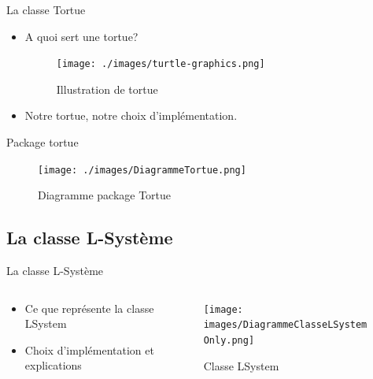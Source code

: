 \documentclass{beamer}
\begin{document}
\begin{frame}{La classe Tortue}
    \begin{itemize}
        \item A quoi sert une tortue?
        \begin{figure}[h]
            \centering
           \texttt{[image: ./images/turtle-graphics.png]}
           \caption{Illustration de tortue}
        \end{figure}
        \item Notre tortue, notre choix d'implémentation.
    \end{itemize}
\end{frame}
\begin{frame}{Package tortue}
    \begin{figure}[h]
	   \texttt{[image: ./images/DiagrammeTortue.png]}
	   \caption{Diagramme package Tortue}
    \end{figure}
\end{frame}
\subsection{La classe L-Système}
\begin{frame}{La classe L-Système}
    \begin{columns}
    \begin{column}{0.5\textwidth}
    \begin{itemize}
        \item Ce que représente la classe LSystem
        \item Choix d'implémentation et explications
    \end{itemize}
    \end{column}
    \begin{column}{0.5\textwidth}
    \begin{figure}
        \centering
        \texttt{[image: images/DiagrammeClasseLSystemOnly.png]}
        \caption{Classe LSystem}
    \end{figure}
    \end{column}
    \end{columns}
\end{frame}
\end{document}

